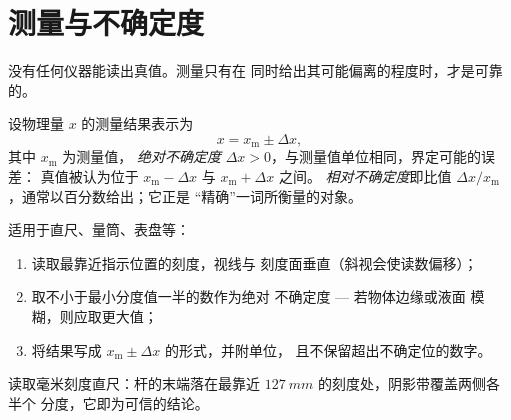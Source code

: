 \section{测量与不确定度}

没有任何仪器能读出真值。测量只有在
同时给出其可能偏离的程度时，才是可靠的。

\begin{definition}[绝对与相对不确定度]\label{def:g10:orders-of-magnitude:uncertainty}
设物理量 $x$ 的测量结果表示为
\[
x = x_{\text{m}} \pm \Delta x ,
\]
其中 $x_{\text{m}}$ 为测量值，
\emph{绝对不确定度} $\Delta x > 0$，与测量值单位相同，界定可能的误差：
真值被认为位于
$x_{\text{m}} - \Delta x$ 与 $x_{\text{m}} + \Delta x$ 之间。
\emph{相对不确定度}即比值
$\Delta x / x_{\text{m}}$，通常以百分数给出；它正是
“精确”一词所衡量的对象。
\end{definition}

\begin{method}[刻度仪器的读数]\label{met:g10:orders-of-magnitude:reading}
适用于直尺、量筒、表盘等：
\begin{enumerate}
  \item 读取最靠近指示位置的刻度，视线与
        刻度面垂直（斜视会使读数偏移）；
  \item 取不小于最小分度值一半的数作为绝对
        不确定度 --- 若物体边缘或液面
        模糊，则应取更大值；
  \item 将结果写成 $x_{\text{m}} \pm \Delta x$ 的形式，并附单位，
        且不保留超出不确定位的数字。
\end{enumerate}
\end{method}

\begin{omfigure}

{\small 读取毫米刻度直尺：杆的末端落在最靠近
$\qty{127}{mm}$ 的刻度处，阴影带覆盖两侧各半个
分度，它即为可信的结论。}
\end{omfigure}

